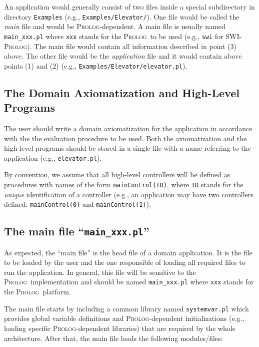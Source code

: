 \documentclass[11pt]{article}
\newcommand{\Prolog}{\mbox{\textsc{Prolog}}}
\begin{document}
An application would generally consist of two files inside a special
subdirectory in directory \texttt{Examples} (e.g.,
\texttt{Examples/Elevator/}). One file would be called the
\textit{main} file and would be \Prolog-dependent. A main file is usually named
\texttt{main\_xxx.pl} where \texttt{xxx} stands for the \Prolog\ to be used
(e.g.,
\texttt{swi} for SWI-\Prolog). The main file would contain all information
described in point (3) above. The other file would be the \textit{application}
file and it would contain above points (1) and (2) (e.g.,
\texttt{Examples/Elevator/elevator.pl}).


\subsection{The Domain Axiomatization and High-Level Programs} 
\label{sec:axiom}

The user should write a domain axiomatization for the application in
accordance with the the evaluation procedure to be used.  Both the
axiomatization and the high-level programs should be stored in a single file
with a name referring to the application (e.g., \texttt{elevator.pl}).

By convention, we assume that all high-level controllers will be defined as
procedures with names of the form \texttt{mainControl(ID)}, where \texttt{ID}
stands for the \textit{unique} identification of a controller
(e.g., an application may have two controllers defined: \texttt{mainControl(0)}
and \texttt{mainControl(1)}).


\subsection{The main file ``\texttt{main\_xxx.pl}''}

As expected, the ``main file'' is the head file of a domain application. It is
the file to be loaded by the user and the one responsible of loading all
required files to run the application. 
%
In general, this file will be sensitive to the \Prolog\ implementation and
should
be named \texttt{main\_xxx.pl} where \texttt{xxx} stands for the \Prolog\
platform. 

The main file starts by including a common library named \texttt{systemvar.pl}
which provides global variable definitions and \Prolog-dependent
initializations
(e.g., loading specific \Prolog-dependent libraries) that are required by the
whole architecture.
%
After that, the main file loads the following modules/files:
\end{document}
